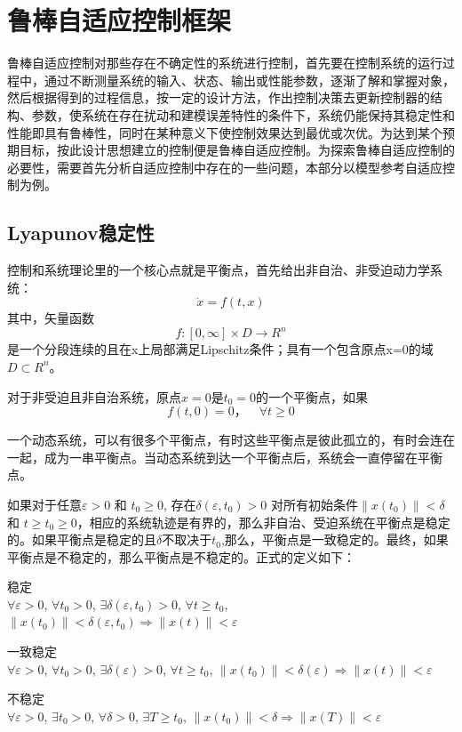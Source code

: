 \section{鲁棒自适应控制框架 }

鲁棒自适应控制对那些存在不确定性的系统进行控制，首先要在控制系统的运行过程中，通过不断测量系统的输入、状态、输出或性能参数，逐渐了解和掌握对象，然后根据得到的过程信息，按一定的设计方法，作出控制决策去更新控制器的结构、参数，使系统在存在扰动和建模误差特性的条件下，系统仍能保持其稳定性和性能即具有鲁棒性，同时在某种意义下使控制效果达到最优或次优。为达到某个预期目标，按此设计思想建立的控制便是鲁棒自适应控制。为探索鲁棒自适应控制的必要性，需要首先分析自适应控制中存在的一些问题，本部分以模型参考自适应控制为例。

\subsection{Lyapunov稳定性 }

控制和系统理论里的一个核心点就是平衡点，首先给出非自治、非受迫动力学系统：
\begin{equation}
\dot x = f(t,x)
\end{equation}
其中，矢量函数\[ f:[0, \infty] \times D \rightarrow R^n\] 是一个分段连续的且在x上局部满足Lipschitz条件；具有一个包含原点x=0的域$D\subset R^n$。

\begin{defn}
对于非受迫且非自治系统，原点$x=0$是$t_0 =0$的一个平衡点，如果
\begin{equation}
f(t,0)=0 ，\quad \forall t \geqslant 0
\end{equation}
\end{defn}

一个动态系统，可以有很多个平衡点，有时这些平衡点是彼此孤立的，有时会连在一起，成为一串平衡点。当动态系统到达一个平衡点后，系统会一直停留在平衡点。

\begin{defn}[李亚普诺夫平衡稳定性]
如果对于任意$\varepsilon >0$ 和 $t_0 \geqslant 0$, 存在$\delta(\varepsilon ,t_0)>0$ 对所有初始条件$\left \| x(t_0) \right \| < \delta$ 和 $t \geq t_0 \geq 0$，相应的系统轨迹是有界的，那么非自治、受迫系统在平衡点是稳定的。如果平衡点是稳定的且$\delta$不取决于$t_0$,那么，平衡点是一致稳定的。最终，如果平衡点是不稳定的，那么平衡点是不稳定的。正式的定义如下：

稳定\\
$\forall \varepsilon >0$, $\forall t_0 >0$, $\exists \delta(\varepsilon,t_0)>0$, $\forall t \geqslant t_0$, $\left \| x(t_0) \right \| < \delta(\varepsilon,t_0) \Rightarrow \left \|  x(t) \right \| <\varepsilon$

一致稳定\\
$\forall \varepsilon >0$, $\forall t_0 >0$, $\exists \delta(\varepsilon)>0$, $\forall t \geqslant t_0$, $\left \| x(t_0) \right \| < \delta(\varepsilon) \Rightarrow \left \|  x(t) \right \| <\varepsilon$

不稳定\\
$\forall \varepsilon >0$, $\exists t_0 >0 $, $\forall \delta>0$, $\exists T\geqslant t_0$, $\left \| x(t_0) \right \| < \delta \Rightarrow \left \|  x(T) \right \| <\varepsilon$
\end{defn}

